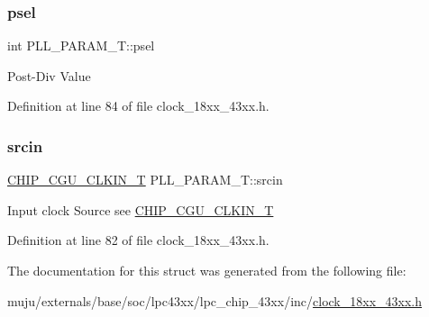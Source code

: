 \subsubsection{\texorpdfstring{psel}{psel}}
{\footnotesize\ttfamily int P\+L\+L\+\_\+\+P\+A\+R\+A\+M\+\_\+\+T\+::psel}

Post-\/\+Div Value 

Definition at line 84 of file clock\+\_\+18xx\+\_\+43xx.\+h.

\mbox{\label{struct_p_l_l___p_a_r_a_m___t_a747254637e606b8056c84c5bf789f861}} 
\subsubsection{\texorpdfstring{srcin}{srcin}}
{\footnotesize\ttfamily \hyperlink{group___c_l_o_c_k__18_x_x__43_x_x_ga0975326707efebf2b074283e6c602f18}{C\+H\+I\+P\+\_\+\+C\+G\+U\+\_\+\+C\+L\+K\+I\+N\+\_\+T} P\+L\+L\+\_\+\+P\+A\+R\+A\+M\+\_\+\+T\+::srcin}

Input clock Source see \hyperlink{group___c_l_o_c_k__18_x_x__43_x_x_ga0975326707efebf2b074283e6c602f18}{C\+H\+I\+P\+\_\+\+C\+G\+U\+\_\+\+C\+L\+K\+I\+N\+\_\+T} 

Definition at line 82 of file clock\+\_\+18xx\+\_\+43xx.\+h.



The documentation for this struct was generated from the following file\+:\begin{DoxyCompactItemize}
\item 
muju/externals/base/soc/lpc43xx/lpc\+\_\+chip\+\_\+43xx/inc/\hyperlink{clock__18xx__43xx_8h}{clock\+\_\+18xx\+\_\+43xx.\+h}\end{DoxyCompactItemize}
